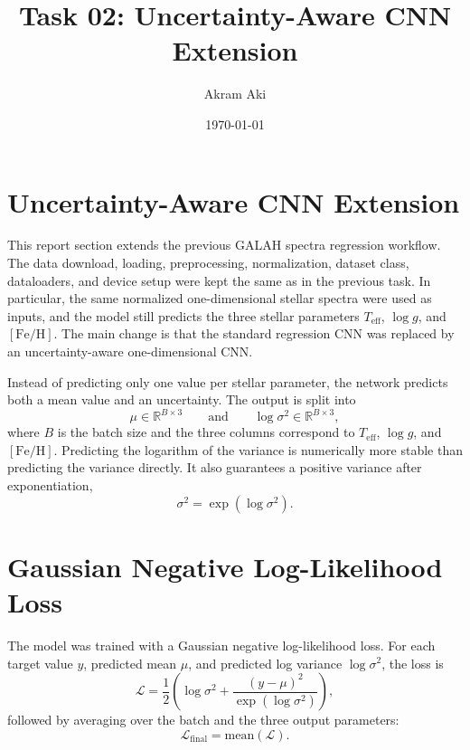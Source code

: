 

\title{Task 02: Uncertainty-Aware CNN Extension}
\author{Akram Aki}
\date{\today}



\maketitle

\section{Uncertainty-Aware CNN Extension}

This report section extends the previous GALAH spectra regression workflow. The data download, loading, preprocessing, normalization, 
dataset class, dataloaders, and device setup were kept the same as in the previous task. In particular, the same normalized one-dimensional 
stellar spectra were used as inputs, and the model still predicts the three stellar parameters 
$T_{\mathrm{eff}}$, $\log g$, and $[\mathrm{Fe/H}]$. The main change is that the standard regression CNN was replaced by an uncertainty-aware 
one-dimensional CNN.

Instead of predicting only one value per stellar parameter, the network predicts both a mean value and an uncertainty. The output is split into
\begin{equation*}
    \mu \in \mathbb{R}^{B \times 3}
    \qquad \text{and} \qquad
    \log \sigma^2 \in \mathbb{R}^{B \times 3},
\end{equation*}
where $B$ is the batch size and the three columns correspond to $T_{\mathrm{eff}}$, $\log g$, and $[\mathrm{Fe/H}]$. 
Predicting the logarithm of the variance is numerically more stable than predicting the variance directly. 
It also guarantees a positive variance after exponentiation,
\begin{equation*}
    \sigma^2 = \exp(\log \sigma^2).
\end{equation*}


\section{Gaussian Negative Log-Likelihood Loss}

The model was trained with a Gaussian negative log-likelihood loss. 
For each target value $y$, predicted mean $\mu$, and predicted log variance $\log \sigma^2$, the loss is
\begin{equation*}
    \mathcal{L} = \frac{1}{2} \left( \log \sigma^2 + \frac{(y-\mu)^2}{\exp(\log \sigma^2)} \right),
\end{equation*}
followed by averaging over the batch and the three output parameters:
\begin{equation*}
    \mathcal{L}_{\mathrm{final}} = \mathrm{mean}(\mathcal{L}).
\end{equation*}

